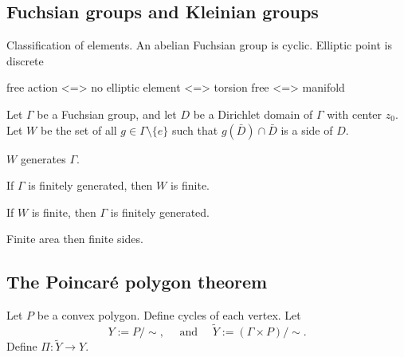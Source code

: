 \documentclass[a4paper]{article}
\begin{document}
\subsection{Fuchsian groups and Kleinian groups}
Classification of elements.
An abelian Fuchsian group is cyclic.
Elliptic point is discrete

free action <=> no elliptic element <=> torsion free <=> manifold




\begin{prb}
Let $\Gamma$ be a Fuchsian group, and let $D$ be a Dirichlet domain of $\Gamma$ with center $z_0$.
Let $W$ be the set of all $g\in\Gamma\setminus\{e\}$ such that $g(\bar D)\cap\bar D$ is a side of $D$.
\begin{parts}
\item $W$ generates $\Gamma$.
\item If $\Gamma$ is finitely generated, then $W$ is finite.
\item If $W$ is finite, then $\Gamma$ is finitely generated.
\end{parts}
\end{prb}

\begin{prb}
Finite area then finite sides.
\begin{parts}
\item
\end{parts}
\end{prb}



\subsection{The Poincar\'e polygon theorem}





\begin{prb}
Let $P$ be a convex polygon.
Define cycles of each vertex.
Let
\[Y:=P/\sim,\quad\text{ and }\quad\tilde Y:=(\Gamma\times P)/\sim.\]
Define $\Pi:\tilde Y\to Y$.
\begin{parts}
\item
\end{parts}
\end{prb}
\end{document}
